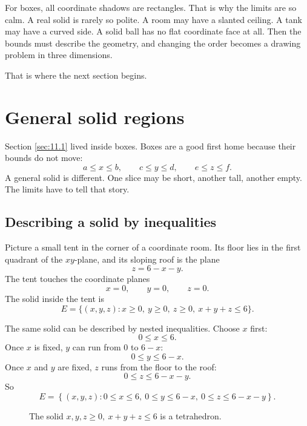 For boxes, all coordinate shadows are rectangles.  That is why the limits are so calm.
A real solid is rarely so polite.  A room may have a slanted ceiling.  A tank may have a
curved side.  A solid ball has no flat coordinate face at all.  Then the bounds must
describe the geometry, and changing the order becomes a drawing problem in three
dimensions.

That is where the next section begins.

\section{General solid regions}
\label{sec:11.2}

Section \ref{sec:11.1} lived inside boxes.  Boxes are a good first home because their
bounds do not move:
\[
    a\le x\le b,\qquad c\le y\le d,\qquad e\le z\le f.
\]
A general solid is different.  One slice may be short, another tall, another empty.  The
limits have to tell that story.

\subsection{Describing a solid by inequalities}

Picture a small tent in the corner of a coordinate room.  Its floor lies in the first
quadrant of the \(xy\)-plane, and its sloping roof is the plane
\[
    z=6-x-y.
\]
The tent touches the coordinate planes
\[
    x=0,\qquad y=0,\qquad z=0.
\]
The solid inside the tent is
\[
    E=\{(x,y,z):x\ge0,\ y\ge0,\ z\ge0,\ x+y+z\le6\}.
\]

The same solid can be described by nested inequalities.  Choose \(x\) first:
\[
    0\le x\le 6.
\]
Once \(x\) is fixed, \(y\) can run from \(0\) to \(6-x\):
\[
    0\le y\le 6-x.
\]
Once \(x\) and \(y\) are fixed, \(z\) runs from the floor to the roof:
\[
    0\le z\le 6-x-y.
\]
So
\[
\boxed{
    E=
    \left\{
    (x,y,z):
    0\le x\le6,\ 
    0\le y\le 6-x,\ 
    0\le z\le 6-x-y
    \right\}.
}
\]

\begin{figure}[h]
\centering
{}
\caption{The solid \(x,y,z\ge0,\ x+y+z\le6\) is a tetrahedron.}
\end{figure}


